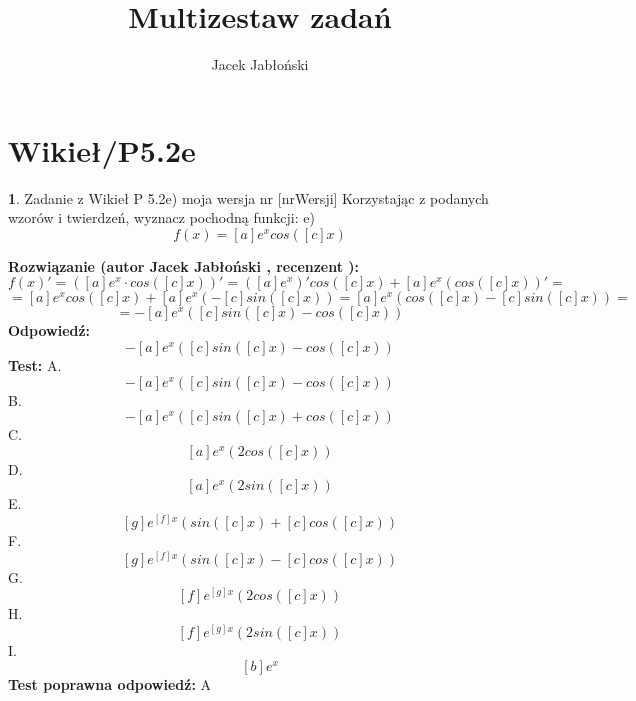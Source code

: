 \documentclass[12pt, a4paper]{article}
\title{Multizestaw zadań}
\author{Jacek Jabłoński}
\date{}
\theoremstyle{definition} %
\newtheorem{zad}{}
\newcommand{\kategoria}[1]{\section{#1}} %
\newcommand{\zadStart}[1]{\begin{zad}#1\newline} %
\newcommand{\zadStop}{\end{zad}}   %
\newcommand{\rozwStart}[2]{\noindent \textbf{Rozwiązanie (autor #1 , recenzent #2): }\newline} %
\newcommand{\rozwStop}{\newline}                                            %
\newcommand{\odpStart}{\noindent \textbf{Odpowiedź:}\newline}    %
\newcommand{\odpStop}{\newline}                                             %
\newcommand{\testStart}{\noindent \textbf{Test:}\newline} %
\newcommand{\testStop}{\newline} %
\newcommand{\kluczStart}{\noindent \textbf{Test poprawna odpowiedź:}\newline} %
\newcommand{\kluczStop}{\newline} %
\begin{document}
\maketitle


\kategoria{Wikieł/P5.2e}
\zadStart{Zadanie z Wikieł P 5.2e) moja wersja nr [nrWersji]}
Korzystając z podanych wzorów i twierdzeń, wyznacz pochodną funkcji:
e) $$f(x)=[a]e^{x}cos([c]x)$$
\zadStop
\rozwStart{Jacek Jabłoński}{}
$$f(x)' = ([a]e^{x} \cdot cos([c]x))' = ([a]e^{x})' cos([c]x) + [a]e^{x} (cos([c]x))' = $$
$$= [a]e^{x} cos([c]x) + [a]e^{x} (-[c]sin([c]x)) = [a]e^{x} (cos([c]x) - [c]sin([c]x)) = $$
$$= -[a]e^{x} ([c]sin([c]x) - cos([c]x))$$
\rozwStop
\odpStart
$$-[a]e^{x} ([c]sin([c]x) - cos([c]x))$$
\odpStop
\testStart
A. $$-[a]e^{x} ([c]sin([c]x) - cos([c]x))$$
B. $$-[a]e^{x} ([c]sin([c]x) + cos([c]x))$$
C. $$ [a]e^{x} (2cos([c]x))$$
D. $$ [a]e^{x} (2sin([c]x))$$
E. $$ [g]e^{[f]x} (sin([c]x) + [c]cos([c]x))$$
F. $$ [g]e^{[f]x} (sin([c]x) - [c]cos([c]x))$$
G. $$ [f]e^{[g]x} (2cos([c]x))$$
H. $$ [f]e^{[g]x} (2sin([c]x))$$
I. $$ [b]e^{x}$$
\testStop
\kluczStart
A
\kluczStop
\end{document}
